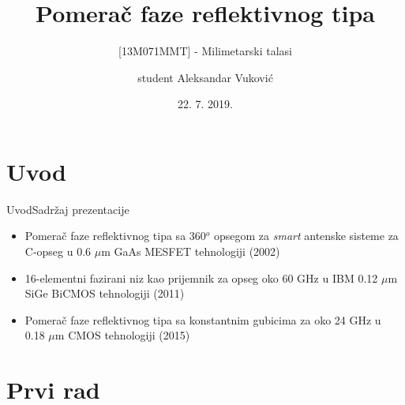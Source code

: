 \documentclass{beamer}
\title{Pomerač faze reflektivnog tipa}
\subtitle{[13M071MMT] - Milimetarski talasi}
\author{student Aleksandar Vuković}
\institute[Univerzitet u Beogradu] %
{
  Univerzitet u Beogradu \\
  Elektrotehnički fakultet
}
\date{22. 7. 2019.}
\begin{document}
\begin{frame}
  \titlepage
\end{frame}


\section{Uvod}


\begin{frame}{Uvod}{Sadržaj prezentacije}
  \begin{itemize}
  \item {
    Pomerač faze reflektivnog tipa sa 360$^o$ opsegom za \textit{smart} antenske sisteme za C-opseg u 0.6 $\mu$m GaAs MESFET tehnologiji (2002)
  }

  \item {
    16-elementni fazirani niz kao prijemnik za opseg oko 60 GHz u IBM 0.12 $\mu$m SiGe BiCMOS tehnologiji (2011)
  }

  \item {
    Pomerač faze reflektivnog tipa sa konstantnim gubicima za oko 24 GHz u 0.18 $\mu$m CMOS tehnologiji (2015)
  }
  \end{itemize}
\end{frame}




\section{Prvi rad}
\end{document}
